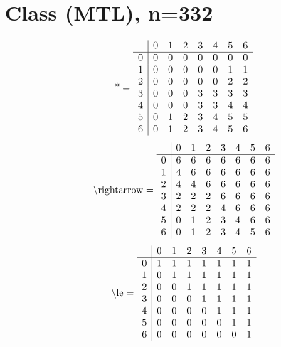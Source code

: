 \documentclass[11pt]{article}
\begin{document}
\section{Class (MTL), n=332}
\[\text{*} = 
\begin{array}{r | r r r r r r r}
 & 0 & 1 & 2 & 3 & 4 & 5 & 6 \\ \hline
0 & 0 & 0 & 0 & 0 & 0 & 0 & 0 \\
1 & 0 & 0 & 0 & 0 & 0 & 1 & 1 \\
2 & 0 & 0 & 0 & 0 & 0 & 2 & 2 \\
3 & 0 & 0 & 0 & 3 & 3 & 3 & 3 \\
4 & 0 & 0 & 0 & 3 & 3 & 4 & 4 \\
5 & 0 & 1 & 2 & 3 & 4 & 5 & 5 \\
6 & 0 & 1 & 2 & 3 & 4 & 5 & 6 \\
\end{array}
\]
\[\text{\textbackslash rightarrow} = 
\begin{array}{r | r r r r r r r}
 & 0 & 1 & 2 & 3 & 4 & 5 & 6 \\ \hline
0 & 6 & 6 & 6 & 6 & 6 & 6 & 6 \\
1 & 4 & 6 & 6 & 6 & 6 & 6 & 6 \\
2 & 4 & 4 & 6 & 6 & 6 & 6 & 6 \\
3 & 2 & 2 & 2 & 6 & 6 & 6 & 6 \\
4 & 2 & 2 & 2 & 4 & 6 & 6 & 6 \\
5 & 0 & 1 & 2 & 3 & 4 & 6 & 6 \\
6 & 0 & 1 & 2 & 3 & 4 & 5 & 6 \\
\end{array}
\]
\[\text{\textbackslash le} = 
\begin{array}{r | r r r r r r r}
 & 0 & 1 & 2 & 3 & 4 & 5 & 6 \\ \hline
0 & 1 & 1 & 1 & 1 & 1 & 1 & 1 \\
1 & 0 & 1 & 1 & 1 & 1 & 1 & 1 \\
2 & 0 & 0 & 1 & 1 & 1 & 1 & 1 \\
3 & 0 & 0 & 0 & 1 & 1 & 1 & 1 \\
4 & 0 & 0 & 0 & 0 & 1 & 1 & 1 \\
5 & 0 & 0 & 0 & 0 & 0 & 1 & 1 \\
6 & 0 & 0 & 0 & 0 & 0 & 0 & 1 \\
\end{array}
\]
\end{document}
